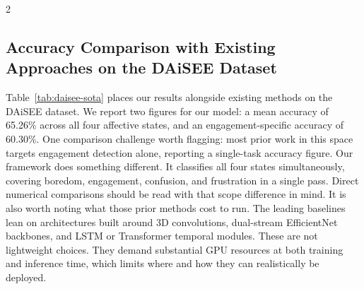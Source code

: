 \begin{multicols}{2}

  \subsection{Accuracy Comparison with Existing Approaches on the DAiSEE Dataset}
  \label{sec:sota-comparison}

  Table~\ref{tab:daisee-sota} places our results alongside existing methods on the DAiSEE dataset. We report two figures for our model: a mean accuracy of 65.26\% across all four affective states, and an engagement-specific accuracy of 60.30\%.
  One comparison challenge worth flagging: most prior work in this space targets engagement detection alone, reporting a single-task accuracy figure. Our framework does something different. It classifies all four states simultaneously, covering boredom, engagement, confusion, and frustration in a single pass. Direct numerical comparisons should be read with that scope difference in mind.
  It is also worth noting what those prior methods cost to run. The leading baselines lean on architectures built around 3D convolutions, dual-stream EfficientNet backbones, and LSTM or Transformer temporal modules. These are not lightweight choices. They demand substantial GPU resources at both training and inference time, which limits where and how they can realistically be deployed.


\end{multicols}
